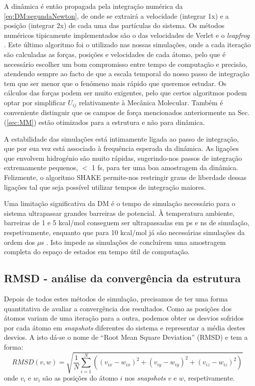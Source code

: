 \documentclass[12pt,a4paper]{article}
\begin{document}
	A dinâmica é então propagada pela integração numérica da \cref{eq:DM:segundaNewton}, de onde se extrairá a velocidade (integrar 1x) e a posição (integrar 2x) de cada uma das partículas do sistema. Os métodos numéricos tipicamente implementados são o das velocidades de Verlet e o \textit{leapfrog} \cite{newman2013computational}. Este último algoritmo foi o utilizado nas nossas simulações, onde a cada iteração são calculadas as forças, posições e velocidades de cada átomo, pelo que é necessário escolher um bom compromisso entre tempo de computação e precisão, atendendo sempre ao facto de que a escala temporal do nosso passo de integração tem que ser menor que o fenómeno mais rápido que queremos estudar.
	Os cálculos das forças podem ser muito exigentes, pelo que certos algoritmos podem optar por simplificar $U_{ij}$ relativamente à Mecânica Molecular. Também é conveniente distinguir que os campos de força mencionados anteriormente na Sec. (\ref{sec:MM}) estão otimizados para a estrutura e não para dinâmica.
	
	A estabilidade das simulações está intimamente ligada ao passo de integração, que por sua vez está associado à frequência esperada da dinâmica. As ligações que envolvem hidrogénio são muito rápidas, sugerindo-nos passos de integração extremamente pequenos, $<$ 1 fs, para ter uma boa amostragem da dinâmica. Felizmente, o algoritmo SHAKE \cite{ryckaertNumericalIntegrationCartesian1977} permite-nos restringir graus de liberdade dessas ligações tal que seja possível utilizar tempos de integração maiores.
	
	Uma limitação significativa da DM é o tempo de simulação necessário para o sistema ultrapassar grandes barreiras de potencial. À temperatura ambiente, barreiras de 1 e 5 kcal/mol conseguem ser ultrapassadas em ps e ns de simulação, respetivamente, enquanto que para 10 kcal/mol já são necessárias simulações da ordem dos $\mu$s \cite{cheathamMolecularModelingNucleic2001}. Isto impede as simulações de concluírem uma amostragem completa do espaço de estados em tempo útil de computação.
	
\subsection{RMSD - análise da convergência da estrutura}
	Depois de todos estes métodos de simulação, precisamos de ter uma forma quantitativa de avaliar a convergência dos resultados. Como as posições dos átomos variam de uma iteração para a outra, podemos obter os desvios sofridos por cada átomo em \textit{snapshots} diferentes do sistema e representar a média destes desvios. A isto dá-se o nome de ``Root Mean Square Deviation'' (RMSD) e tem a forma:
	\begin{equation}
		R M S D(v, w)=\sqrt{\frac{1}{N} \sum_{i=1}^{N}\left(\left(v_{i x}-w_{i x}\right)^{2}+\left(v_{i y}-w_{i y}\right)^{2}+\left(v_{i z}-w_{i z}\right)^{2}\right)}
	\end{equation}
	onde $v_i$ e $w_i$ são as posições do átomo $i$ nos \textit{snapshots} $v$ e $w$, respetivamente.
	
\end{document}
